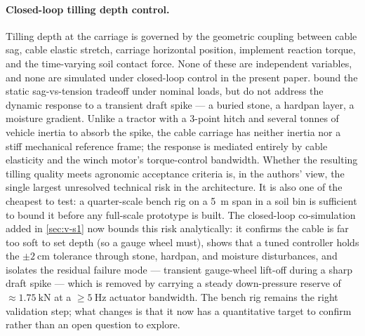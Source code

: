 \documentclass[11pt,a4paper]{article}
\begin{document}
\paragraph{Closed-loop tilling depth control.} Tilling depth at the carriage is governed by the geometric coupling between cable sag, cable elastic stretch, carriage horizontal position, implement reaction torque, and the time-varying soil contact force. None of these are independent variables, and none are simulated under closed-loop control in the present paper.  bound the static sag-vs-tension tradeoff under nominal loads, but do not address the dynamic response to a transient draft spike --- a buried stone, a hardpan layer, a moisture gradient. Unlike a tractor with a 3-point hitch and several tonnes of vehicle inertia to absorb the spike, the cable carriage has neither inertia nor a stiff mechanical reference frame; the response is mediated entirely by cable elasticity and the winch motor's torque-control bandwidth. Whether the resulting tilling quality meets agronomic acceptance criteria is, in the authors' view, the single largest unresolved technical risk in the architecture. It is also one of the cheapest to test: a quarter-scale bench rig on a \SI{5}{\meter} span in a soil bin is sufficient to bound it before any full-scale prototype is built. The closed-loop co-simulation added in \cref{sec:v-s1} now bounds this risk analytically: it confirms the cable is far too soft to set depth (so a gauge wheel must), shows that a tuned controller holds the \(\pm\SI{2}{\centi\meter}\) tolerance through stone, hardpan, and moisture disturbances, and isolates the residual failure mode --- transient gauge-wheel lift-off during a sharp draft spike --- which is removed by carrying a steady down-pressure reserve of ${\approx}\SI{1.75}{\kilo\newton}$ at a ${\geq}\SI{5}{\hertz}$ actuator bandwidth. The bench rig remains the right validation step; what changes is that it now has a quantitative target to confirm rather than an open question to explore.
\end{document}
